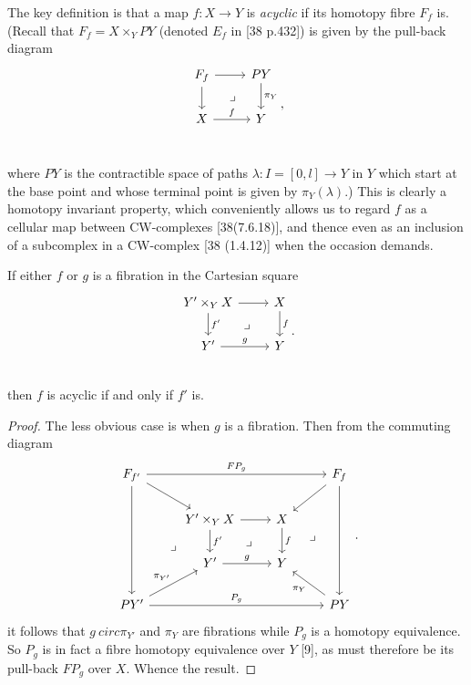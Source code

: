 The key definition is that a map $f\colon   X \longrightarrow Y$ is {\em acyclic} if its homotopy fibre $F_f$ is. (Recall that $F_f = X \times_Y PY$ (denoted $E_f$ in [38 p.432]) is given by the pull-back diagram
\[\begin{tikzcd}
F_f \arrow{r} \arrow{d} \arrow[dr, phantom, "\lrcorner"]& PY \arrow{d}{\pi_Y}\\
X \arrow{r}{f} & Y \\
\end{tikzcd},\]

where $PY$ is the contractible space of paths $\lambda\colon  I = [0,l]\longrightarrow Y$ in $Y$ which start at the base point and whose terminal point is given by $\pi_Y(\lambda)$.) This is clearly a homotopy invariant property, which conveniently allows us to regard $f$ as a cellular map between CW-complexes [38(7.6.18)], and thence even as an inclusion of a subcomplex in a CW-complex [38 (1.4.12)] when the occasion demands.
\begin{prop}
  If either $f$ or $g$ is a fibration in the Cartesian square
\[\begin{tikzcd}
Y'\times_Y X \arrow{r} \arrow{d}{f'} \arrow[dr, phantom, "\lrcorner"]& X\arrow{d}{f}\\
Y' \arrow{r}{g} & Y \\
\end{tikzcd}.\]
then $f$ is acyclic if and only if $f'$ is.
\end{prop}
\begin{proof}
The less obvious case is when $g$ is a fibration. Then from the commuting diagram 
\[\begin{tikzcd}
F_{f'} \arrow{rd} \arrow{rrr}{FP_g} \arrow{ddd}\arrow[ddr, phantom, "\lrcorner",bend right,near end] & & & F_f \arrow{ld} \arrow{ddd}\\
      &Y'\times_Y X \arrow{r} \arrow{d}{f'} \arrow[dr, phantom, "\lrcorner"]& X\arrow{d}{f} \arrow[ddr, phantom, "\lrcorner",bend left,near start]&\\
      &Y' \arrow{r}{g} & Y & \\
PY' \arrow{ur}{\pi_{Y'}} \arrow{rrr}{P_g} & & & PY \arrow{ul}{\pi_Y}
\end{tikzcd}.\]
it follows that $g\ 
circ \pi_{Y'}$ and $\pi_Y$ are fibrations while $P_g$ is a homotopy equivalence. So $P_g$ is in fact a fibre homotopy equivalence over $Y$ [9], as must therefore be its pull-back $FP_g$ over $X$.
Whence the result.
\end{proof}

